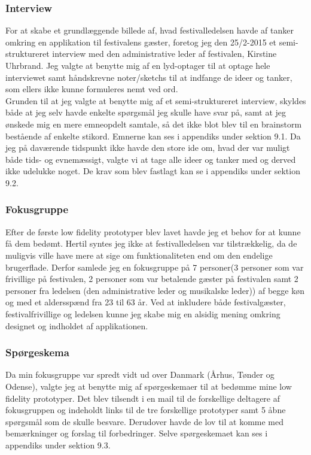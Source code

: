 \documentclass[a4paper,10pt,titlepage]{article}
\begin{document}
\subsubsection{Interview}
For at skabe et grundlæggende billede af, hvad festivalledelsen havde af tanker omkring en applikation til festivalens gæster, foretog jeg den 25/2-2015 et semi-struktureret interview med den administrative leder af festivalen, Kirstine Uhrbrand. Jeg valgte at benytte mig af en lyd-optager til at optage hele interviewet samt håndskrevne noter/sketchs til at indfange de ideer og tanker, som ellers ikke kunne formuleres nemt ved ord. \\
Grunden til at jeg valgte at benytte mig af et semi-struktureret interview, skyldes både at jeg selv havde enkelte spørgsmål jeg skulle have svar på, samt at jeg ønskede mig en mere emneopdelt samtale, så det ikke blot blev til en brainstorm bestående af enkelte stikord. Emnerne kan ses i appendiks under sektion 9.1. Da jeg på daværende tidspunkt ikke havde den store ide om, hvad der var muligt både tids- og evnemæssigt, valgte vi at tage alle ideer og tanker med og derved ikke udelukke noget. De krav som blev fastlagt kan se i appendiks under sektion 9.2.
\subsubsection{Fokusgruppe}
Efter de første low fidelity prototyper blev lavet havde jeg et behov for at kunne få dem bedømt. Hertil syntes jeg ikke at festivalledelsen var tilstrækkelig, da de muligvis ville have mere at sige om funktionaliteten end om den endelige brugerflade. Derfor samlede jeg en fokusgruppe på 7 personer(3 personer som var frivillige på festivalen, 2 personer som var betalende gæster på festivalen samt 2 personer fra ledelsen (den administrative leder og musikalske leder)) af begge køn og med et aldersspænd fra 23 til 63 år. Ved at inkludere både festivalgæster, festivalfrivillige og ledelsen kunne jeg skabe mig en alsidig mening omkring designet og indholdet af applikationen. 
\subsubsection*{Spørgeskema}
Da min fokusgruppe var spredt vidt ud over Danmark (Århus, Tønder og Odense), valgte jeg at benytte mig af spørgeskemaer til at bedømme mine low fidelity prototyper. Det blev tilsendt i en mail til de forskellige deltagere af fokusgruppen og indeholdt links til de tre forskellige prototyper samt 5 åbne spørgsmål som de skulle besvare. Derudover havde de lov til at komme med bemærkninger og forslag til forbedringer. Selve spørgeskemaet kan ses i appendiks under sektion 9.3.
\end{document}
